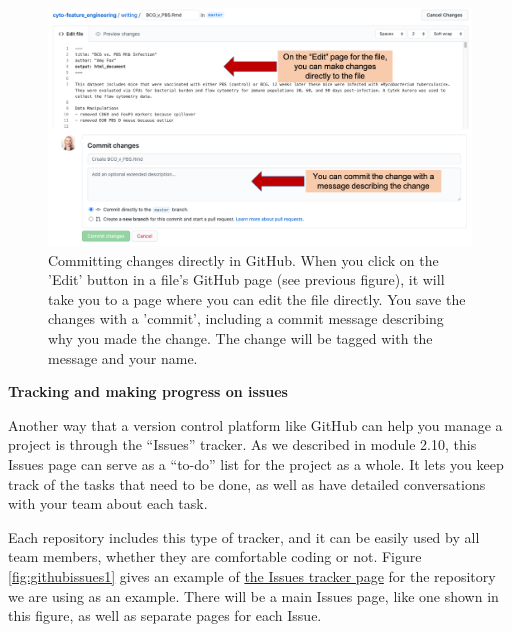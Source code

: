 \documentclass[]{tufte-book}
\begin{document}
\begin{figure}
\includegraphics[width=\textwidth]{figures/github_commits2} \caption[Committing changes directly in GitHub]{Committing changes directly in GitHub. When you click on the 'Edit' button in a file's GitHub page (see previous figure), it will take you to a page where you can edit the file directly. You save the changes with a 'commit', including a commit message describing why you made the change. The change will be tagged with the message and your name.}\label{fig:githubcommits2}
\end{figure}

\textbf{Tracking and making progress on issues}

Another way that a version control platform like GitHub can help you manage a
project is through the ``Issues'' tracker. As we described in module 2.10,
this Issues page can serve as a ``to-do'' list for the project as a whole.
It lets you keep track of the tasks that need to be done, as well as
have detailed conversations with your team about each task.

Each repository includes this type of tracker, and it can be easily used by all
team members, whether they are comfortable coding or not. Figure
\ref{fig:githubissues1} gives an example of \href{https://github.com/aef1004/cyto-feature_engineering/issues}{the Issues tracker
page} for the
repository we are using as an example. There will be a main Issues page, like
one shown in this figure, as well as separate pages for each Issue.
\end{document}
